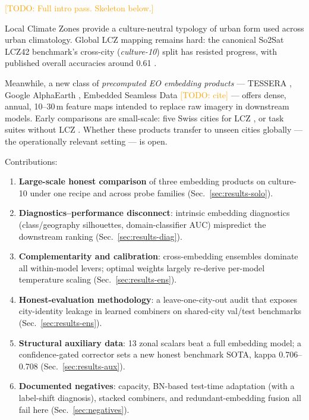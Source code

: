 \documentclass[11pt]{article}
\newcommand{\todo}[1]{\textcolor{orange}{[TODO: #1]}}
\begin{document}
\todo{Full intro pass. Skeleton below.}

Local Climate Zones \citep{stewart2012lcz} provide a
culture-neutral typology of urban form used across urban climatology.
Global LCZ mapping remains hard: the canonical So2Sat LCZ42
benchmark's cross-city (\emph{culture-10}) split has resisted
progress, with published overall accuracies around
0.61 \citep{zhu2020so2sat,qiu2020sen2lcz}.

Meanwhile, a new class of \emph{precomputed EO embedding products}
--- TESSERA \citep{tessera2025}, Google AlphaEarth
\citep{alphaearth2025}, Embedded Seamless Data \todo{cite} --- offers
dense, annual, 10--30\,m feature maps intended to replace raw imagery
in downstream models. Early comparisons are small-scale: five Swiss
cities for LCZ \citep{swiss_lcz2026}, or task suites without LCZ
\citep{bettertogether2026}. Whether these products transfer to unseen
cities globally --- the operationally relevant setting --- is open.

Contributions:
\begin{enumerate}
  \item \textbf{Large-scale honest comparison} of three embedding
    products on culture-10 under one recipe and across probe families
    (Sec.~\ref{sec:results-solo}).
  \item \textbf{Diagnostics--performance disconnect}: intrinsic
    embedding diagnostics (class/geography silhouettes,
    domain-classifier AUC) mispredict the downstream ranking
    (Sec.~\ref{sec:results-diag}).
  \item \textbf{Complementarity and calibration}: cross-embedding
    ensembles dominate all within-model levers; optimal weights
    largely re-derive per-model temperature scaling
    (Sec.~\ref{sec:results-ens}).
  \item \textbf{Honest-evaluation methodology}: a leave-one-city-out
    audit that exposes city-identity leakage in learned combiners on
    shared-city val/test benchmarks (Sec.~\ref{sec:results-ens}).
  \item \textbf{Structural auxiliary data}: 13 zonal scalars beat a
    full embedding model; a confidence-gated corrector sets a new
    honest benchmark SOTA, kappa 0.706--0.708
    (Sec.~\ref{sec:results-aux}).
  \item \textbf{Documented negatives}: capacity, BN-based test-time
    adaptation (with a label-shift diagnosis), stacked combiners, and
    redundant-embedding fusion all fail here (Sec.~\ref{sec:negatives}).
\end{enumerate}
\end{document}
